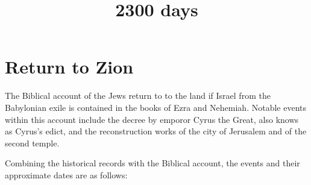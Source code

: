 \documentclass[]{book}
\begin{document}
\title{2300 days}

\maketitle

\tableofcontents




\section{Return to Zion}
The Biblical account of the Jews return to to the land if Israel from the Babylonian exile is contained
in the books of Ezra and Nehemiah. Notable events within this account include the decree by emporor Cyrus the Great, also knows as Cyrus's edict, and the
reconstruction works of the city of Jerusalem and of the second temple.

Combining the historical records with the Biblical account, the events and their approximate dates are as follows:
\end{document}
